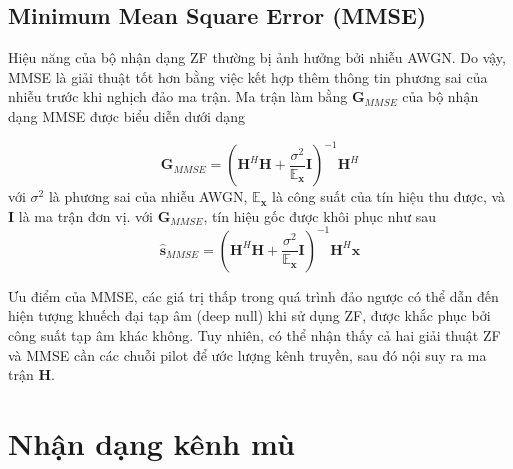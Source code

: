 \subsection{Minimum Mean Square Error (MMSE)} \label{sec:mmse}

Hiệu năng của bộ nhận dạng ZF thường bị ảnh hưởng bởi nhiễu AWGN. Do vậy, MMSE là giải thuật tốt hơn bằng việc kết hợp thêm thông tin phương sai của nhiễu trước khi nghịch đảo ma trận. Ma trận làm bằng $\mathbf{G}_{MMSE}$ của bộ nhận dạng MMSE được biểu diễn dưới dạng

\begin{equation}
    \mathbf{G}_{MMSE}=\left(\mathbf{H}^H \mathbf{H}+\frac{\sigma^2}{\mathbb{E}_\mathbf{x}} \mathbf{I}\right)^{-1} \mathbf{H}^H
\end{equation}
với $\sigma^2$ là phương sai của nhiễu AWGN, $\mathbb{E}_\mathbf{x}$ là công suất của tín hiệu thu được, và $\mathbf{I}$ là ma trận đơn vị. với $\mathbf{G}_{MMSE}$, tín hiệu gốc được khôi phục như sau
\begin{equation}
    \hat{\mathbf{s}}_{MMSE}=\left(\mathbf{H}^H \mathbf{H}+\frac{\sigma^2}{\mathbb{E}_\mathbf{x}} \mathbf{I}\right)^{-1} \mathbf{H}^H \mathbf{x}
\end{equation}

Ưu điểm của MMSE, các giá trị thấp trong quá trình đảo ngược có thể dẫn đến hiện tượng khuếch đại tạp âm (deep null) khi sử dụng ZF, được khắc phục bởi công suất tạp âm khác không. Tuy nhiên, có thể nhận thấy cả hai giải thuật ZF và MMSE cần các chuỗi pilot để ước lượng kênh truyền, sau đó nội suy ra ma trận $\mathbf{H}$.

\section{Nhận dạng kênh mù} \label{sec:blind}

